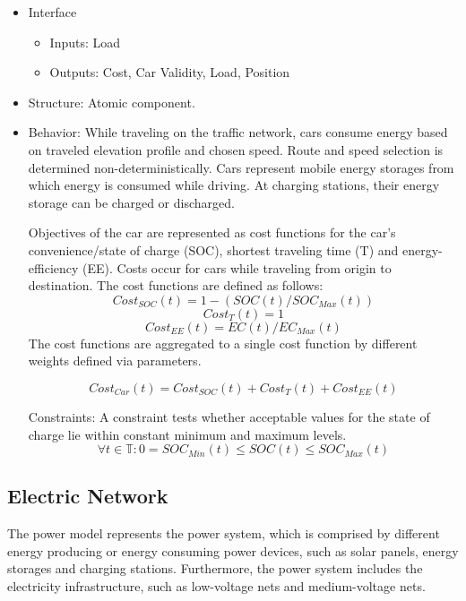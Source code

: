 	\begin{itemize}
	\item Interface
		\begin{itemize}
			\item Inputs: {\color{red} Load}
			\item Outputs: Cost, Car Validity, {\color{red} Load}, Position
		\end{itemize}	
	\item Structure: Atomic component.
	\item Behavior:	While traveling on the traffic network, cars consume energy based on traveled elevation profile and chosen speed. Route and speed selection is determined non-deterministically. Cars represent mobile energy storages from which energy is consumed while driving. At charging stations, their energy storage can be charged or discharged.
	
	Objectives of the car are represented as cost functions for the car's convenience/state of charge (SOC), shortest traveling time (T) and energy-efficiency (EE). Costs occur for cars while traveling from origin to destination. The cost functions are defined as follows:
	\[
	Cost_{SOC}(t) =  1-(SOC(t)/SOC_{Max}(t))
	\]
	\[
	Cost_{T}(t) =  1
	\]
	\[
	Cost_{EE}(t) =  EC(t)/EC_{Max}(t)
	\]
	The cost functions are aggregated to a single cost function by different weights defined via parameters.
	
	\[
	Cost_{Car}(t)=Cost_{SOC}(t) + Cost_{T}(t) + Cost_{EE}(t)
	\]
	
	Constraints: A constraint tests whether acceptable values for the state of charge lie within constant minimum and maximum levels.
	\[
	\forall t \in \mathbb{T} : \mathrm{0} =  SOC_{Min}(t) \leq SOC(t) \leq SOC_{Max}(t)
	\]
\end{itemize}

\subsection{Electric Network}

The power model represents the power system, which is comprised by different energy producing or energy consuming power devices, such as solar panels, energy storages and charging stations. Furthermore, the power system includes the electricity infrastructure, such as low-voltage nets and medium-voltage nets.

